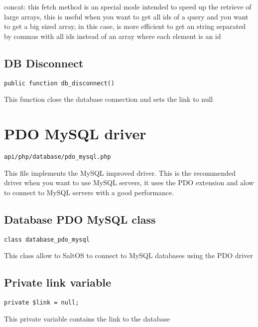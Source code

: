 \documentclass[a4paper]{book}
\begin{document}
concat: this fetch method is an special mode intended to speed up the retrieve of large
arrays, this is useful when you want to get all ids of a query and you want to get a big
sized array, in this case, is more efficient to get an string separated by commas with all
ids instead of an array where each element is an id

\hypertarget{toc345}{}
\subsection{DB Disconnect}

\begin{lstlisting}
public function db_disconnect()
\end{lstlisting}

This function close the database connection and sets the link to null

\hypertarget{toc346}{}
\section{PDO MySQL driver}

\begin{lstlisting}
api/php/database/pdo_mysql.php
\end{lstlisting}

This file implements the MySQL improved driver. This is the recommended driver when you want
to use MySQL servers, it uses the PDO extension and alow to connect to MySQL servers with a
good performance.

\hypertarget{toc347}{}
\subsection{Database PDO MySQL class}

\begin{lstlisting}
class database_pdo_mysql
\end{lstlisting}

This class allow to SaltOS to connect to MySQL databases using the PDO driver

\hypertarget{toc348}{}
\subsection{Private link variable}

\begin{lstlisting}
private $link = null;
\end{lstlisting}

This private variable contains the link to the database
\end{document}
